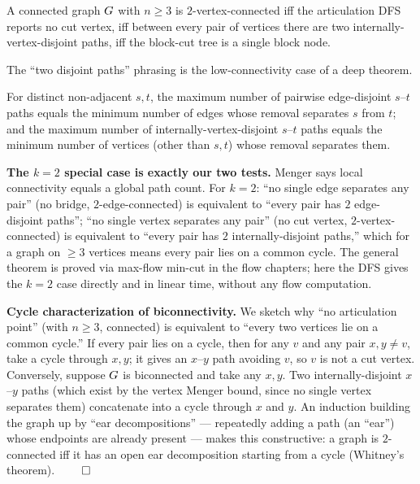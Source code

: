 \begin{corollary}
\label{ch10:cor-2vc}
A connected graph $G$ with $n\ge3$ is $2$-vertex-connected iff the articulation DFS
reports no cut vertex, iff between every pair of vertices there are two
internally-vertex-disjoint paths, iff the block-cut tree is a single block node.
\end{corollary}

The ``two disjoint paths'' phrasing is the low-connectivity case of a deep theorem.

\begin{theorem}
\label{ch10:thm-menger}
For distinct non-adjacent $s,t$, the maximum number of pairwise edge-disjoint $s$--$t$
paths equals the minimum number of edges whose removal separates $s$ from $t$; and the
maximum number of internally-vertex-disjoint $s$--$t$ paths equals the minimum number
of vertices (other than $s,t$) whose removal separates them.
\end{theorem}

\begin{whybox}
\textbf{The $k=2$ special case is exactly our two tests.} Menger says local
connectivity equals a global path count. For $k=2$: ``no single edge separates any
pair'' (no bridge, $2$-edge-connected) is equivalent to ``every pair has $2$
edge-disjoint paths''; ``no single vertex separates any pair'' (no cut vertex,
$2$-vertex-connected) is equivalent to ``every pair has $2$ internally-disjoint
paths,'' which for a graph on $\ge3$ vertices means every pair lies on a common cycle.
The general theorem is proved via max-flow min-cut in the flow chapters; here the DFS
gives the $k=2$ case directly and in linear time, without any flow computation.
\end{whybox}

\begin{formalbox}
\textbf{Cycle characterization of biconnectivity.} We sketch why ``no articulation
point'' (with $n\ge3$, connected) is equivalent to ``every two vertices lie on a common
cycle.'' If every pair lies on a cycle, then for any $v$ and any pair $x,y\neq v$, take
a cycle through $x,y$; it gives an $x$--$y$ path avoiding $v$, so $v$ is not a cut
vertex. Conversely, suppose $G$ is biconnected and take any $x,y$. Two
internally-disjoint $x$--$y$ paths (which exist by the vertex Menger bound, since no
single vertex separates them) concatenate into a cycle through $x$ and $y$. An
induction building the graph up by ``ear decompositions'' --- repeatedly adding a path
(an ``ear'') whose endpoints are already present --- makes this constructive: a graph
is $2$-connected iff it has an open ear decomposition starting from a cycle (Whitney's
theorem). $\qed$
\end{formalbox}

